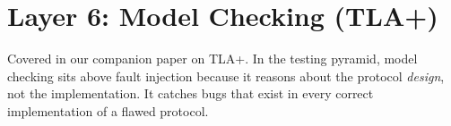 \section{Layer 6: Model Checking (TLA+)}


Covered in our companion paper on TLA+. In the testing pyramid, model checking sits
above fault injection because it reasons about the protocol \emph{design}, not the
implementation. It catches bugs that exist in every correct implementation of a flawed
protocol.

